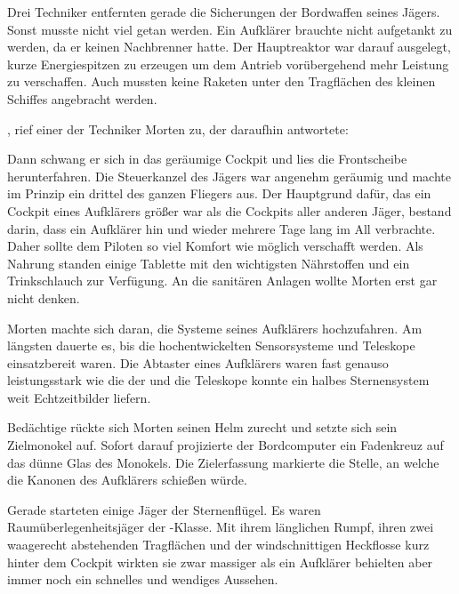 \par

Drei Techniker entfernten gerade die Sicherungen der Bordwaffen seines Jägers. Sonst musste nicht viel getan werden. Ein Aufklärer brauchte nicht aufgetankt zu werden, da er keinen Nachbrenner hatte. Der Hauptreaktor war darauf ausgelegt, kurze Energiespitzen zu erzeugen um dem Antrieb vorübergehend mehr Leistung zu verschaffen. Auch mussten keine Raketen unter den Tragflächen des kleinen Schiffes angebracht werden.

\par

, rief einer der Techniker Morten zu, der daraufhin antwortete: 

\par

Dann schwang er sich in das geräumige Cockpit und lies die Frontscheibe herunterfahren. Die Steuerkanzel des Jägers war angenehm geräumig und machte im Prinzip ein drittel des ganzen Fliegers aus. Der Hauptgrund dafür, das ein Cockpit eines Aufklärers größer war als die Cockpits aller anderen Jäger, bestand darin, dass ein Aufklärer hin und wieder mehrere Tage lang im All verbrachte. Daher sollte dem Piloten so viel Komfort wie möglich verschafft werden. Als Nahrung standen einige Tablette mit den wichtigsten Nährstoffen und ein Trinkschlauch zur Verfügung. An die sanitären Anlagen wollte Morten erst gar nicht denken.

\par

Morten machte sich daran, die Systeme seines Aufklärers hochzufahren. Am längsten dauerte es, bis die hochentwickelten Sensorsysteme und Teleskope einsatzbereit waren. Die Abtaster eines Aufklärers waren fast genauso leistungsstark wie die der  und die Teleskope konnte ein halbes Sternensystem weit Echtzeitbilder liefern.

\par

Bedächtige rückte sich Morten seinen Helm zurecht und setzte sich sein Zielmonokel auf. Sofort darauf projizierte der Bordcomputer ein Fadenkreuz auf das dünne Glas des Monokels. Die Zielerfassung markierte die Stelle, an welche die Kanonen des Aufklärers schießen würde.

\par

Gerade starteten einige Jäger der Sternenflügel. Es waren Raumüberlegenheitsjäger der -Klasse. Mit ihrem länglichen Rumpf, ihren zwei waagerecht abstehenden Tragflächen und der windschnittigen Heckflosse kurz hinter dem Cockpit wirkten sie zwar massiger als ein Aufklärer behielten aber immer noch ein schnelles und wendiges Aussehen.

